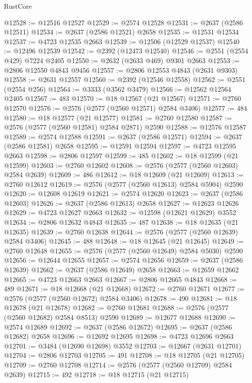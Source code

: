 \begin{lexlean}{RustCore}
\begin{coremodule}
@12528 := @12516 @12527
@12529 := @2574 @12528
@12531 := @2637 (@2586 @12511)
@12534 := @2637 (@2586 @12521) @2658
@12535 := @12531 @12534
@12537 := @4723 @12535 @2663
@12539 := @12506 (@12529 @12537)
@12540 := @12496 @12539
@12542 := @2392 (@12473 @12540)
@12546 := @2551 (@2554 @429) @7224 @2405
@12550 := @2632 (@2633 @469) @9301 @2663
@12553 := @2806 @12550 @4843 @9456
@12557 := @2806 @12553 @4843 (@2631 @9303)
@12558 := @2631 @12557
@12560 := @2392 (@12546 @12558)
@12562 := @2551 (@2554 @256)
@12564 := @3333 (@3562 @3479)
@12566 := @12562 @12564 @2405
@12567 := 483
@12570 := @18 @12567 (@21 @12567)
@12571 := @2760 @12570
@12576 := @2576 (@2577 (@2560 @12571) @2584 @3406)
@12577 := 484
@12580 := @18 @12577 (@21 @12577)
@12581 := @2760 @12580
@12587 := @2576 (@2577 (@2560 @12581) @2584 @2871) @2590
@12588 := @12576 @12587
@12589 := @2574 @12588
@12591 := @2637 (@2586 @12571)
@12594 := @2637 (@2586 @12581) @2658
@12595 := @12591 @12594
@12597 := @4723 @12595 @2663
@12598 := @2806 @12597
@12599 := 485
@12602 := @18 @12599 (@21 @12599)
@12603 := @2760 @12602
@12608 := @2576 (@2577 (@2560 @12603) @2584 @2639)
@12609 := 486
@12612 := @18 @12609 (@21 @12609)
@12613 := @2760 @12612
@12619 := @2576 (@2577 (@2560 @12613) @2584 @5904) @2590
@12620 := @12608 @12619
@12621 := @2574 @12620
@12623 := @2637 (@2586 @12603)
@12626 := @2637 (@2586 @12613) @2658
@12627 := @12623 @12626
@12629 := @4723 @12627 @2663
@12632 := @12598 (@12621 @12629) @3552
@12634 := @2806 @12632 @4843
@12635 := 487
@12638 := @18 @12635 (@21 @12635)
@12639 := @2760 @12638
@12644 := @2576 (@2577 (@2560 @12639) @2584 @3406)
@12645 := 488
@12648 := @18 @12645 (@21 @12645)
@12649 := @2760 @12648
@12655 := @2576 (@2577 (@2560 @12649) @2584 @5030) @2590
@12656 := @12644 @12655
@12657 := @2574 @12656
@12659 := @2637 (@2586 @12639)
@12662 := @2637 (@2586 @12649) @2658
@12663 := @12659 @12662
@12665 := @4723 @12663 @2663
@12667 := @2806 @12665 @4843
@12668 := 489
@12671 := @18 @12668 (@21 @12668)
@12672 := @2760 @12671
@12677 := @2576 (@2577 (@2560 @12672) @2584 @3406)
@12678 := 490
@12681 := @18 @12678 (@21 @12678)
@12682 := @2760 @12681
@12688 := @2576 (@2577 (@2560 @12682) @2584 @8513) @2590
@12689 := @12677 @12688
@12690 := @2574 @12689
@12692 := @2637 (@2586 @12672)
@12695 := @2637 (@2586 @12682) @2658
@12696 := @12692 @12695
@12698 := @4723 @12696 @2663
@12701 := @3484 (@12690 @12698) @3552
@12703 := @12667 (@2631 @12701)
@12704 := @2806 @12703
@12705 := 491
@12708 := @18 @12705 (@21 @12705)
@12709 := @2760 @12708
@12714 := @2576 (@2577 (@2560 @12709) @2584 @2639)
@12715 := 492
@12718 := @18 @12715 (@21 @12715)

\end{coremodule}
\end{lexlean}
